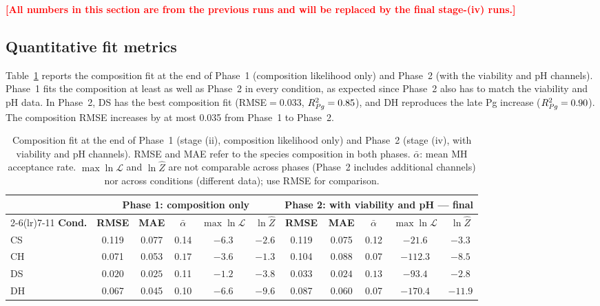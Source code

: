 \documentclass[pdflatex,sn-mathphys-num,lineno]{sn-jnl}
\newcommand{\TBD}[1]{\textcolor{red}{\textbf{[#1]}}}
\begin{document}
\TBD{All numbers in this section are from the previous runs and will be replaced by the final stage-(iv) runs.}

\subsection{Quantitative fit metrics}

Table~\ref{tab:rmse} reports the composition fit at the end of Phase~1 (composition likelihood only) and Phase~2 (with the viability and pH channels).
Phase~1 fits the composition at least as well as Phase~2 in every condition, as expected since Phase~2 also has to match the viability and pH data.
In Phase~2, DS has the best composition fit (RMSE$=$0.033, $R^2_{\text{\textit{Pg}}}=0.85$), and DH reproduces the late Pg increase ($R^2_{\text{\textit{Pg}}}=0.90$).
The composition RMSE increases by at most 0.035 from Phase~1 to Phase~2.

\begin{table}[htbp]
\centering\footnotesize\setlength{\tabcolsep}{3pt}
\begin{tabular}{@{}l ccccc ccccc@{}}
\toprule
& \multicolumn{5}{c}{\textbf{Phase 1: composition only}} & \multicolumn{5}{c}{\textbf{Phase 2: with viability and pH --- final}}\\
\cmidrule(lr){2-6}\cmidrule(lr){7-11}
\textbf{Cond.} & \textbf{RMSE} & \textbf{MAE} & $\bar{\alpha}$ & $\max\ln\mathcal{L}$ & $\ln\hat{Z}$ & \textbf{RMSE} & \textbf{MAE} & $\bar{\alpha}$ & $\max\ln\mathcal{L}$ & $\ln\hat{Z}$\\
\midrule
CS  & 0.119 & 0.077 & 0.14 & $-6.3$ & $-2.6$ & 0.119 & 0.075 & 0.12 & $-21.6$ & $-3.3$\\
CH  & 0.071 & 0.053 & $\mathbf{0.17}$ & $-3.6$ & $-1.3$ & 0.104 & 0.088 & 0.07 & $-112.3$ & $-8.5$\\
DS  & $\mathbf{0.020}$ & $\mathbf{0.025}$ & 0.11 & $\mathbf{-1.2}$ & $-3.8$ & $\mathbf{0.033}$ & $\mathbf{0.024}$ & $\mathbf{0.13}$ & $-93.4$ & $-2.8$\\
DH  & 0.067 & 0.045 & 0.10 & $-6.6$ & $-9.6$ & 0.087 & 0.060 & 0.07 & $-170.4$ & $-11.9$\\
\bottomrule
\end{tabular}
\caption{Composition fit at the end of Phase~1 (stage (ii), composition likelihood only) and Phase~2 (stage (iv), with viability and pH channels).
RMSE and MAE refer to the species composition in both phases.
$\bar{\alpha}$: mean MH acceptance rate.
$\max\ln\mathcal{L}$ and $\ln\hat{Z}$ are not comparable across phases (Phase~2 includes additional channels) nor across conditions (different data); use RMSE for comparison.}
\label{tab:rmse}
\end{table}
\end{document}
